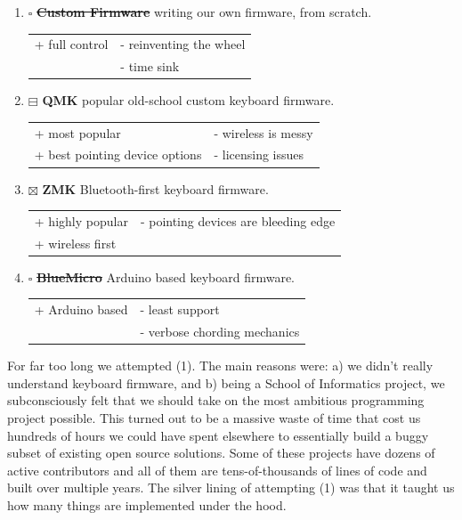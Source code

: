 \documentclass[logo,bsc,singlespacing,parskip]{infthesis}
\begin{document}
\begin{enumerate}
\item{$\square$} \sout{\textbf{Custom Firmware}} writing our own firmware, from scratch.
\begin{longtable}{|p{6.25cm}|p{6.25cm}|}
\hline
+ full control & - reinventing the wheel\\
 & - time sink\\
\hline
\end{longtable}

\item{$\boxminus$} \textbf{QMK} \autocite{QMKFirmware} popular old-school custom keyboard firmware.
\begin{longtable}{|p{6.25cm}|p{6.25cm}|}
\hline
+ most popular & - wireless is messy\\
+ best pointing device options & - licensing issues\\
\hline
\end{longtable}

\item{$\boxtimes$} \textbf{ZMK} \autocite{ZMKFirmware}  Bluetooth-first keyboard firmware.
\begin{longtable}{|p{6.25cm}|p{6.25cm}|}
\hline
+ highly popular & - pointing devices are bleeding edge\\
+ wireless first & \\
\hline
\end{longtable}

\item{$\square$} \sout{\textbf{BlueMicro}} \autocite{constantineauBlueMicroFirmware2022} Arduino based keyboard firmware.
\begin{longtable}{|p{6.25cm}|p{6.25cm}|}
\hline
+ Arduino based & - least support\\
 & - verbose chording mechanics\\
\hline
\end{longtable}
\end{enumerate}

For far too long we attempted (1).
The main reasons were: a) we didn't really understand keyboard firmware, and b) being a School of Informatics project, we subconsciously felt that we should take on the most ambitious programming project possible.
This turned out to be a massive waste of time that cost us hundreds of hours we could have spent elsewhere to essentially build a buggy subset of existing open source solutions.
Some of these projects have dozens of active contributors and all of them are tens-of-thousands of lines of code and built over multiple years.
The silver lining of attempting (1) was that it taught us how many things are implemented under the hood.
\end{document}

